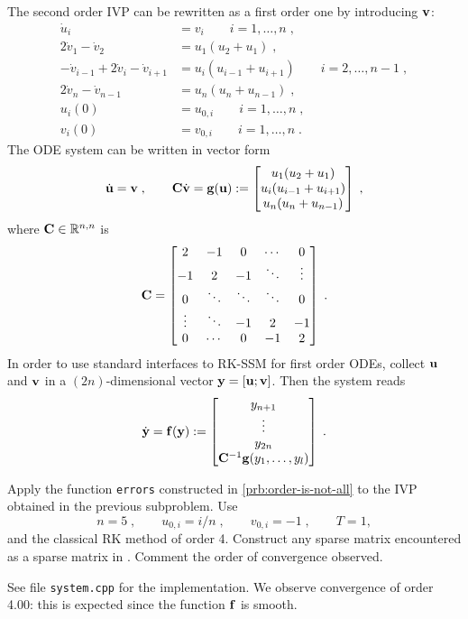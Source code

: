 \begin{problem}
\begin{subproblem}[3]
\begin{solution}
The second order IVP can be rewritten as a first order one by introducing ${\mathbf{v}}$:
\begin{align*}
\dot u_i & = v_i  \qquad i=1,\ldots,n\;,\\
2\dot v_1-\dot v_2  &= u_1(u_2+u_1)\;,\\
-\dot v_{i-1} + 2\dot v_i-\dot v_{i+1}  &= u_i(u_{i-1}+u_{i+1})\qquad i=2,\ldots,n-1\;,\\
2\dot v_n-\dot v_{n-1}  &= u_n(u_n+u_{n-1})\;,\\
u_i(0) &= u_{0,i} \qquad i=1,\ldots,n\;,\\
v_i(0) &= v_{0,i} \qquad i=1,\ldots,n\;.
\end{align*}
The ODE system can be written in vector form
$$\dot{{\mathbf{u}}}={\mathbf{v}}\;,\qquad  {\mathbf{C}}\dot{{\mathbf{v}}} = {\mathbf{g}}({\mathbf{u}}):=
\begin{bmatrix}    u_1(u_2+u_1)\\  u_i(u_{i-1}+u_{i+1})\\   u_n(u_n+u_{n-1})  \end{bmatrix}\;,  $$
where ${\mathbf{C}}\in\mathbb{R}^{n,n}$ is
$${\mathbf{C}} =\begin{bmatrix}
 2 & -1 &  0 & \cdots & 0 \\
-1 &  2 & -1 & \ddots & \vdots \\
 0 & \ddots & \ddots & \ddots & 0\\
\vdots & \ddots& -1 & 2 & -1\\
 0 & \cdots & 0 & -1 & 2
\end{bmatrix}\;.$$ 
In order to use standard interfaces to RK-SSM for first order ODEs, collect ${\mathbf{u}}$ and ${\mathbf{v}}$ in a $(2n)$-dimensional vector ${\mathbf{y}}=[{\mathbf{u}};{\mathbf{v}}]$. Then the system reads
$$ \dot {{\mathbf{y}}} = {\mathbf{f}}({\mathbf{y}}) := 
\begin{bmatrix} y_{n+1} \\  \vdots  \\ y_{2n}\\  {\mathbf{C}}^{-1} {\mathbf{g}}(y_1,\ldots,y_l)  \end{bmatrix}\;. $$
\end{solution}
\end{subproblem}


\begin{subproblem}[3] \label{subprb:SystemODEs_1}
Apply the function \texttt{errors} constructed in \ref{prb:order-is-not-all} to the IVP obtained in the previous subproblem. Use
\[
n=5\;,\qquad u_{0,i} =  i/n\;, \qquad v_{0,i}=-1\;,\qquad T=1,
\]
and the classical RK method of order 4. Construct any sparse matrix encountered as a sparse matrix in \Eigen{}. Comment the order of convergence observed.
\begin{solution}
See file \texttt{system.cpp} for the implementation. We observe convergence of order 4.00: this is expected since the function  ${\mathbf{f}}$ is smooth.
\end{solution}
\end{subproblem}
\end{problem}
